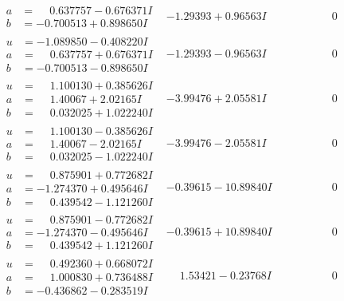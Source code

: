 \documentclass[1p]{elsarticle_modified}
\theoremstyle{definition}
\begin{document}
$$\begin{array}{c|c|c}
\begin{aligned}
a &= \phantom{-}0.637757 - 0.676371 I \\
b &= -0.700513 + 0.898650 I\end{aligned}
 & -1.29393 + 0.96563 I & \phantom{-0.000000 } 0 \\ \hline\begin{aligned}
u &= -1.089850 - 0.408220 I \\
a &= \phantom{-}0.637757 + 0.676371 I \\
b &= -0.700513 - 0.898650 I\end{aligned}
 & -1.29393 - 0.96563 I & \phantom{-0.000000 } 0 \\ \hline\begin{aligned}
u &= \phantom{-}1.100130 + 0.385626 I \\
a &= \phantom{-}1.40067 + 2.02165 I \\
b &= \phantom{-}0.032025 + 1.022240 I\end{aligned}
 & -3.99476 + 2.05581 I & \phantom{-0.000000 } 0 \\ \hline\begin{aligned}
u &= \phantom{-}1.100130 - 0.385626 I \\
a &= \phantom{-}1.40067 - 2.02165 I \\
b &= \phantom{-}0.032025 - 1.022240 I\end{aligned}
 & -3.99476 - 2.05581 I & \phantom{-0.000000 } 0 \\ \hline\begin{aligned}
u &= \phantom{-}0.875901 + 0.772682 I \\
a &= -1.274370 + 0.495646 I \\
b &= \phantom{-}0.439542 - 1.121260 I\end{aligned}
 & -0.39615 - 10.89840 I & \phantom{-0.000000 } 0 \\ \hline\begin{aligned}
u &= \phantom{-}0.875901 - 0.772682 I \\
a &= -1.274370 - 0.495646 I \\
b &= \phantom{-}0.439542 + 1.121260 I\end{aligned}
 & -0.39615 + 10.89840 I & \phantom{-0.000000 } 0 \\ \hline\begin{aligned}
u &= \phantom{-}0.492360 + 0.668072 I \\
a &= \phantom{-}1.000830 + 0.736488 I \\
b &= -0.436862 - 0.283519 I\end{aligned}
 & \phantom{-}1.53421 - 0.23768 I & \phantom{-0.000000 } 0 \\ \hline\begin{aligned}

\end{aligned}
\end{array}$$
\end{document}
